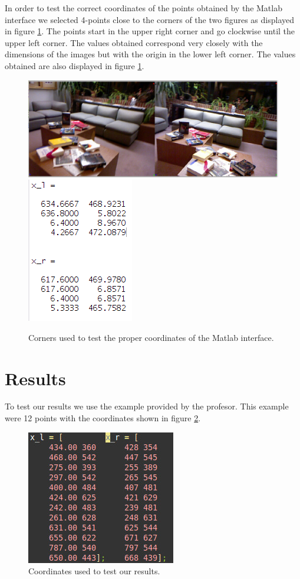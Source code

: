 \documentclass[a4paper,12pt]{article}
\begin{document}
    In order to test the correct coordinates of the points obtained by the Matlab interface
    we selected 4-points close to the corners of the two figures as displayed in figure \ref{fig:check}. 
    The points start in the upper right corner and go clockwise until the upper left corner. 
    The values obtained correspond very closely with the dimensions of the images but with the
    origin in the lower left corner. The values obtained are also displayed in figure \ref{fig:check}.
    \begin{figure}[h]
        \centering
        \includegraphics[totalheight=.20\textheight]{./images/Test.jpg}
        \vspace{1px}
        \includegraphics[totalheight=.18\textheight]{./images/TestPts.png}
        \caption{Corners used to test the proper coordinates of the Matlab interface.}
        \label{fig:check}
    \end{figure}

    \section{Results}
    To test our results we use the example provided by the profesor. This example were
    12 points with the coordinates shown in figure \ref{fig:epts}.
    \begin{figure}[h]
        \centering
        \includegraphics[totalheight=.20\textheight]{./images/Ppts.jpg}
        \caption{Coordinates used to test our results.}
        \label{fig:epts}
    \end{figure}


    
\end{document}
